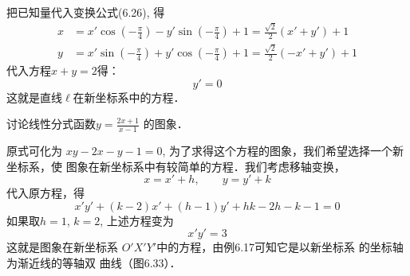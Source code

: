 \begin{solution}
把已知量代入变换公式(6.26), 得
\[\begin{split}
 x&=x'\cos\left(-\frac{\pi}{4}\right)-y'\sin\left(-\frac{\pi}{4}\right)+1=\frac{\sqrt{2}}{2}(x'+y')+1\\
y&=x'\sin\left(-\frac{\pi}{4}\right)+y'\cos\left(-\frac{\pi}{4}\right)+1=\frac{\sqrt{2}}{2}(-x'+y')+1   
\end{split}\]
代入方程$x+y=2$得：$$y'=0$$
这就是直线$\ell$在新坐标系中的方程．
\end{solution}

\begin{example}
    讨论线性分式函数$y=\frac{2x+1}{x-1}$
    的图象．
\end{example}

\begin{solution}
    原式可化为 $xy-2x-y-1=0$, 为了求得这个方程的图象，我们希望选择一个新坐标系，使
    图象在新坐标系中有较简单的方程．我们考虑移轴变换，
\[x=x'+h,\qquad y=y'+k\]
代入原方程，得
\[x'y'+(k-2)x'+(h-1)y'+hk-2h-k-1=0\]
如果取$h=1$, $k=2$, 上述方程变为
\[x'y'=3\]
这就是图象在新坐标系
$O'X'Y'$中的方程，由例6.17可知它是以新坐标系
的坐标轴为渐近线的等轴双
曲线（图6.33）．
\end{solution}

\begin{figure}[htp]
    \centering
{}
    \caption{}
\end{figure}



